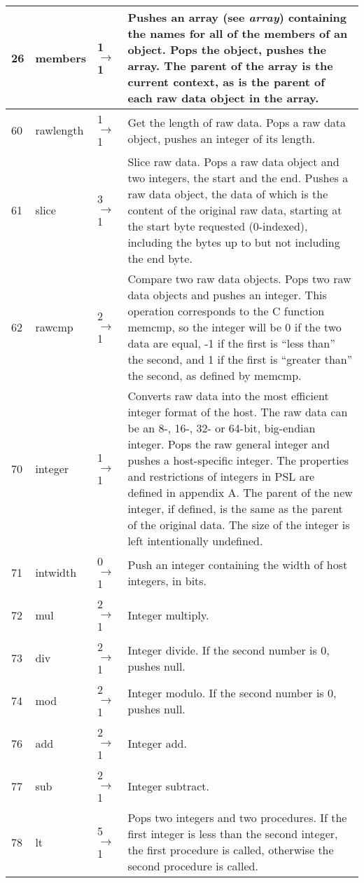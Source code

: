 \begin{longtable}{ | l | l | l | X | }
\hline
26 & members & 1 $\rightarrow$ 1 & Pushes an array (see \textit{array}) containing the names for all of the members of an object. Pops the object, pushes the array. The parent of the array is the current context, as is the parent of each raw data object in the array. \\
\hline
60 & rawlength & 1 $\rightarrow$ 1 & Get the length of raw data. Pops a raw data object, pushes an integer of its length. \\
\hline
61 & slice & 3 $\rightarrow$ 1 & Slice raw data. Pops a raw data object and two integers, the start and the end. Pushes a raw data object, the data of which is the content of the original raw data, starting at the start byte requested (0-indexed), including the bytes up to but not including the end byte. \\
\hline
62 & rawcmp & 2 $\rightarrow$ 1 & Compare two raw data objects. Pops two raw data objects and pushes an integer. This operation corresponds to the C function memcmp, so the integer will be 0 if the two data are equal, -1 if the first is “less than” the second, and 1 if the first is “greater than” the second, as defined by memcmp. \\
\hline
70 & integer & 1 $\rightarrow$ 1 & Converts raw data into the most efficient integer format of the host. The raw data can be an 8-, 16-, 32- or 64-bit, big-endian integer. Pops the raw general integer and pushes a host-specific integer. The properties and restrictions of integers in PSL are defined in appendix A. The parent of the new integer, if defined, is the same as the parent of the original data. The size of the integer is left intentionally undefined. \\
\hline
71 & intwidth & 0 $\rightarrow$ 1 & Push an integer containing the width of host integers, in bits. \\
\hline
72 & mul & 2 $\rightarrow$ 1 & Integer multiply. \\
\hline
73 & div & 2 $\rightarrow$ 1 & Integer divide. If the second number is 0, pushes null. \\
\hline
74 & mod & 2 $\rightarrow$ 1 & Integer modulo. If the second number is 0, pushes null. \\
\hline
76 & add & 2 $\rightarrow$ 1 & Integer add. \\
\hline
77 & sub & 2 $\rightarrow$ 1 & Integer subtract. \\
\hline
78 & lt & 5 $\rightarrow$ 1 & Pops two integers and two procedures. If the first integer is less than the second integer, the first procedure is called, otherwise the second procedure is called. \\

\end{longtable}
